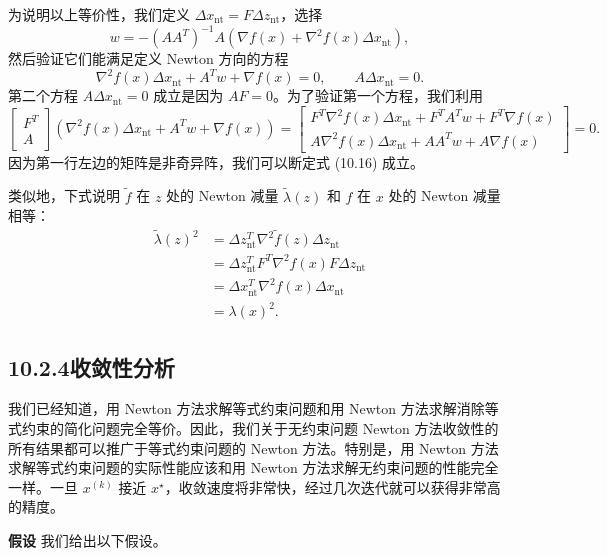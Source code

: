 \documentclass[UTF8,12pt,a4paper,fontset=fandol]{ctexart}
\begin{document}
为说明以上等价性，我们定义 $\Delta x_{\mathrm{nt}}=F\Delta z_{\mathrm{nt}}$，选择
\[
w=-(AA^T)^{-1}A\left(\nabla f(x)+\nabla^2 f(x)\Delta x_{\mathrm{nt}}\right),
\]
然后验证它们能满足定义 Newton 方向的方程
\begin{equation}
\nabla^2 f(x)\Delta x_{\mathrm{nt}}+A^Tw+\nabla f(x)=0,\qquad
A\Delta x_{\mathrm{nt}}=0.
\tag{10.16}
\end{equation}
第二个方程 $A\Delta x_{\mathrm{nt}}=0$ 成立是因为 $AF=0$。为了验证第一个方程，我们利用
\[
\begin{bmatrix}
F^T\\
A
\end{bmatrix}
\left(\nabla^2 f(x)\Delta x_{\mathrm{nt}}+A^Tw+\nabla f(x)\right)
=
\begin{bmatrix}
F^T\nabla^2 f(x)\Delta x_{\mathrm{nt}}+F^TA^Tw+F^T\nabla f(x)\\
A\nabla^2 f(x)\Delta x_{\mathrm{nt}}+AA^Tw+A\nabla f(x)
\end{bmatrix}
=0.
\]
因为第一行左边的矩阵是非奇异阵，我们可以断定式 (10.16) 成立。

类似地，下式说明 $\tilde{f}$ 在 $z$ 处的 Newton 减量 $\tilde{\lambda}(z)$ 和 $f$ 在 $x$ 处的 Newton 减量相等：
\[
\begin{aligned}
\tilde{\lambda}(z)^2
&=\Delta z_{\mathrm{nt}}^T\nabla^2\tilde{f}(z)\Delta z_{\mathrm{nt}}\\
&=\Delta z_{\mathrm{nt}}^TF^T\nabla^2 f(x)F\Delta z_{\mathrm{nt}}\\
&=\Delta x_{\mathrm{nt}}^T\nabla^2 f(x)\Delta x_{\mathrm{nt}}\\
&=\lambda(x)^2.
\end{aligned}
\]

\subsection*{10.2.4\quad 收敛性分析}

我们已经知道，用 Newton 方法求解等式约束问题和用 Newton 方法求解消除等式约束的简化问题完全等价。因此，我们关于无约束问题 Newton 方法收敛性的所有结果都可以推广于等式约束问题的 Newton 方法。特别是，用 Newton 方法求解等式约束问题的实际性能应该和用 Newton 方法求解无约束问题的性能完全一样。一旦 $x^{(k)}$ 接近 $x^\star$，收敛速度将非常快，经过几次迭代就可以获得非常高的精度。

\noindent\textbf{假设}\quad
我们给出以下假设。
\end{document}

